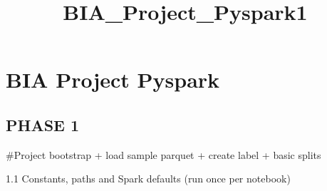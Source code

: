 \documentclass[11pt]{article}
\title{BIA\_Project\_Pyspark1}
\begin{document}
    
    \maketitle
    
    

    
    \section{BIA Project Pyspark}\label{bia-project-pyspark}

    \subsection{PHASE 1}\label{phase-1}

    \#Project bootstrap + load sample parquet + create label + basic splits

    1.1 Constants, paths and Spark defaults (run once per notebook)
\end{document}

